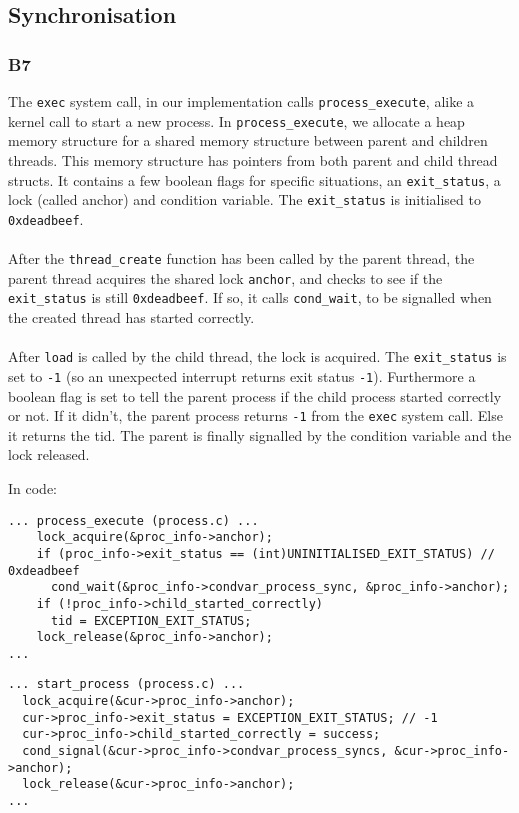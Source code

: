 \documentclass[a4wide, 11pt]{article}
\newcommand{\tx}{\texttt}
\begin{document}
\subsection{Synchronisation}
\subsubsection{B7}

The \tx{exec} system call, in our implementation calls \tx{process\_execute}, alike a kernel call to start a new process. In \tx{process\_execute}, we allocate a heap memory structure for a shared memory structure between parent and children threads. This memory structure has pointers from both parent and child thread structs. It contains a few boolean flags for specific situations, an \tx{exit\_status}, a lock (called anchor) and condition variable. The \tx{exit\_status} is initialised to \tx{0xdeadbeef}.
\\\\
After the \tx{thread\_create} function has been called by the parent thread, the parent thread acquires the shared lock \tx{anchor}, and checks to see if the \tx{exit\_status} is still \tx{0xdeadbeef}. If so, it calls \tx{cond\_wait}, to be signalled when the created thread has started correctly.
\\\\
After \texttt{load} is called by the child thread, the lock is acquired. The \tx{exit\_status} is set to \tx{-1} (so an unexpected interrupt returns exit status \tx{-1}). Furthermore a boolean flag is set to tell the parent process if the child process started correctly or not. If it didn't, the parent process returns \tx{-1} from the \texttt{exec} system call. Else it returns the tid. The parent is finally signalled by the condition variable and the lock released.

In code:

\begin{verbatim}
... process_execute (process.c) ...
    lock_acquire(&proc_info->anchor);
    if (proc_info->exit_status == (int)UNINITIALISED_EXIT_STATUS) // 0xdeadbeef
      cond_wait(&proc_info->condvar_process_sync, &proc_info->anchor);
    if (!proc_info->child_started_correctly)
      tid = EXCEPTION_EXIT_STATUS;
    lock_release(&proc_info->anchor);
...
\end{verbatim}

\begin{verbatim}
... start_process (process.c) ...
  lock_acquire(&cur->proc_info->anchor);
  cur->proc_info->exit_status = EXCEPTION_EXIT_STATUS; // -1
  cur->proc_info->child_started_correctly = success;
  cond_signal(&cur->proc_info->condvar_process_syncs, &cur->proc_info->anchor);
  lock_release(&cur->proc_info->anchor);
...
\end{verbatim}
\end{document}
